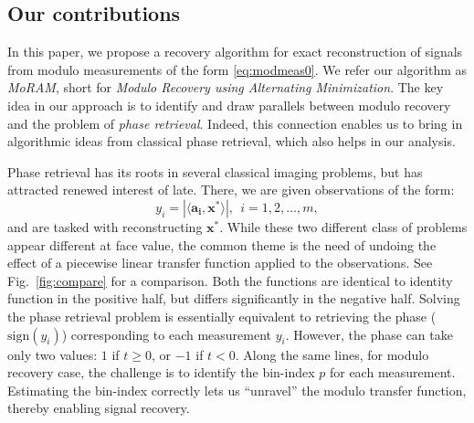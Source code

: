 \subsection{Our contributions}
In this paper, we propose a recovery algorithm for exact reconstruction of signals from modulo measurements of the form \eqref{eq:modmeas0}. We refer our algorithm as \emph{MoRAM}, short for \emph{Modulo Recovery using Alternating Minimization}. The key idea in our approach is to identify and draw parallels between modulo recovery and the problem of \emph{phase retrieval}. Indeed, this connection enables us to bring in algorithmic ideas from classical phase retrieval, which also helps in our analysis. 

Phase retrieval has its roots in several classical imaging problems, but has attracted renewed interest of late. There, we are given observations of the form:
\[
y_i= | \langle \mathbf{a_i} , \mathbf{x^*} \rangle|,~~i = 1, 2, \ldots, m,
\]
and are tasked with reconstructing $\mathbf{x^*}$.  While these two different class of problems appear different at face value, the common theme is the need of undoing the effect of a piecewise linear transfer function applied to the observations. See Fig.~\ref{fig:compare} for a comparison.
Both the functions are identical to identity function in the positive half, but differs significantly in the negative half. Solving the phase retrieval problem is essentially equivalent to retrieving the phase ($\text{sign}\left(y_i\right)$) corresponding to each measurement $y_i$. However, the phase can take only two values: $1$ if $t \geq 0$, or $-1$ if $t < 0$. Along the same lines, for modulo recovery case, the challenge is to identify the bin-index $p$ for each measurement. %
Estimating the bin-index correctly lets us ``unravel'' the modulo transfer function, thereby enabling signal recovery.
